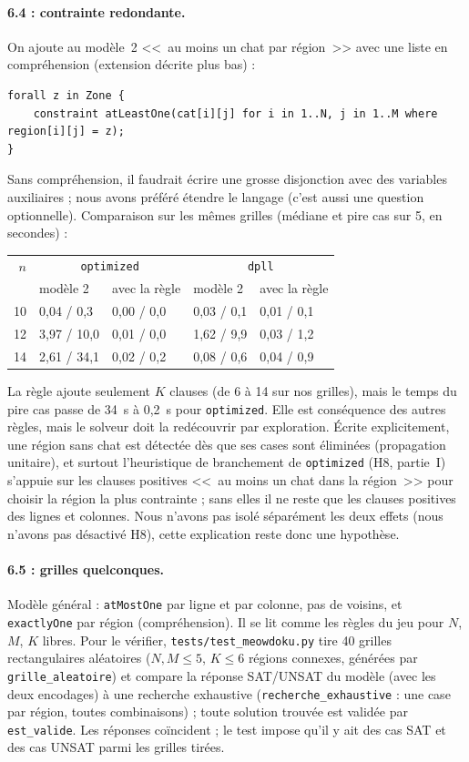 \documentclass[11pt,a4paper]{article}
\newcommand{\f}[1]{\texttt{#1}}
\begin{document}
\paragraph{6.4 : contrainte redondante.} On ajoute au modèle~2 <<~au moins un chat par région~>> avec une liste en compréhension (extension décrite plus bas) :
\begin{verbatim}
forall z in Zone {
    constraint atLeastOne(cat[i][j] for i in 1..N, j in 1..M where region[i][j] = z);
}
\end{verbatim}
Sans compréhension, il faudrait écrire une grosse disjonction avec des variables auxiliaires ; nous avons préféré étendre le langage (c'est aussi une question optionnelle). Comparaison sur les mêmes grilles (médiane et pire cas sur 5, en secondes) :

\begin{center}
\small
\begin{tabular}{rllll}
\toprule
$n$ & \multicolumn{2}{c}{\f{optimized}} & \multicolumn{2}{c}{\f{dpll}}\\
 & modèle 2 & avec la règle & modèle 2 & avec la règle\\
\midrule
10 & 0,04 / 0,3 & 0,00 / 0,0 & 0,03 / 0,1 & 0,01 / 0,1\\
12 & 3,97 / 10,0 & 0,01 / 0,0 & 1,62 / 9,9 & 0,03 / 1,2\\
14 & 2,61 / 34,1 & 0,02 / 0,2 & 0,08 / 0,6 & 0,04 / 0,9\\
\bottomrule
\end{tabular}
\end{center}

La règle ajoute seulement $K$ clauses (de 6 à 14 sur nos grilles), mais le temps du pire cas passe de 34~s à 0,2~s pour \f{optimized}. Elle est conséquence des autres règles, mais le solveur doit la redécouvrir par exploration. Écrite explicitement, une région sans chat est détectée dès que ses cases sont éliminées (propagation unitaire), et surtout l'heuristique de branchement de \f{optimized} (H8, partie~I) s'appuie sur les clauses positives <<~au moins un chat dans la région~>> pour choisir la région la plus contrainte ; sans elles il ne reste que les clauses positives des lignes et colonnes. Nous n'avons pas isolé séparément les deux effets (nous n'avons pas désactivé H8), cette explication reste donc une hypothèse.

\paragraph{6.5 : grilles quelconques.} Modèle général : \f{atMostOne} par ligne et par colonne, pas de voisins, et \f{exactlyOne} par région (compréhension). Il se lit comme les règles du jeu pour $N$, $M$, $K$ libres. Pour le vérifier, \f{tests/test\_meowdoku.py} tire 40 grilles rectangulaires aléatoires ($N,M\le5$, $K\le 6$ régions connexes, générées par \f{grille\_aleatoire}) et compare la réponse SAT/UNSAT du modèle (avec les deux encodages) à une recherche exhaustive (\f{recherche\_exhaustive} : une case par région, toutes combinaisons) ; toute solution trouvée est validée par \f{est\_valide}. Les réponses coïncident ; le test impose qu'il y ait des cas SAT et des cas UNSAT parmi les grilles tirées.
\end{document}
